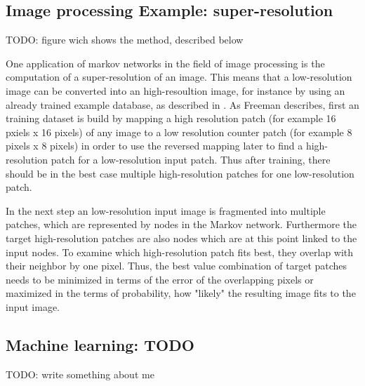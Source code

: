 \subsection{Image processing Example: super-resolution}

TODO: figure wich shows the method, described below

One application of markov networks in the field of image processing is the computation of a super-resolution of an image. This means that a low-resolution image can be converted into an high-resoultion image, for instance by using an already trained example database, as described in \cite{freeman2002example}. As Freeman describes, first an training dataset is build by mapping a high resolution patch (for example 16 pxiels x 16 pixels) of any image to a low resolution counter patch (for example 8 pixels x 8 pixels) in order to use the reversed mapping later to find a high-resolution patch for a low-resolution input patch. Thus after training, there should be in the best case multiple high-resolution patches for one low-resolution patch.

In the next step an low-resolution input image is fragmented into multiple patches, which are represented by nodes in the Markov network. Furthermore the target high-resolution patches are also nodes which are at this point linked to the input nodes. To examine which high-resolution patch fits best, they overlap with their neighbor by one pixel. Thus, the best value combination of target patches needs to be minimized in terms of the error of the overlapping pixels or maximized in the terms of probability, how "likely" the resulting image fits to the input image.

\subsection{Machine learning: TODO}

TODO: write something about me
